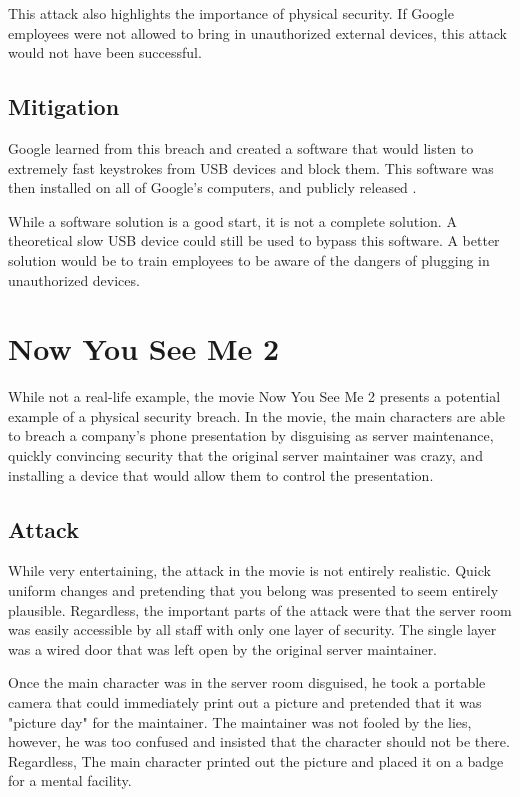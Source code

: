 \documentclass[acmsmall]{acmart}
\begin{document}
This attack also highlights the importance of physical security. If Google employees
were not allowed to bring in unauthorized external devices, this attack would not
have been successful.

\subsection{Mitigation}
Google learned from this breach and created a software that would listen to extremely
fast keystrokes from USB devices and block them. This software was then installed
on all of Google's computers, and publicly released \cite{Google02}.

While a software solution is a good start, it is not a complete solution. A theoretical
slow USB device could still be used to bypass this software. A better solution would
be to train employees to be aware of the dangers of plugging in unauthorized devices.

\section{Now You See Me 2}
While not a real-life example, the movie Now You See Me 2 \cite{NowYouSeeMe2} presents
a potential example of a physical security breach. In the movie, the main characters
are able to breach a company's phone presentation by disguising as server maintenance,
quickly convincing security that the original server maintainer was crazy, and
installing a device that would allow them to control the presentation.

\subsection{Attack}
While very entertaining, the attack in the movie is not entirely realistic. Quick uniform
changes and pretending that you belong was presented to seem entirely plausible. Regardless,
the important parts of the attack were that the server room was easily accessible by all staff
with only one layer of security. The single layer was a wired door that was left open
by the original server maintainer.

Once the main character was in the server room disguised, he took a portable camera that could
immediately print out a picture and pretended that it was "picture day" for the maintainer.
The maintainer was not fooled by the lies, however, he was too confused and insisted that the
character should not be there. Regardless, The main character printed out the picture and
placed it on a badge for a mental facility.
\end{document}
